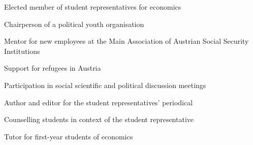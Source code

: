 

	{\begin{cvenumerate}
		\item Elected member of student representatives for economics
		\item Chairperson of a political youth organisation
	\end{cvenumerate}}

	{\begin{cvenumerate}
		\item Mentor for new employees at the Main Association of Austrian Social Security Institutions
		\item Support for refugees in Austria
		\item Participation in social scientific and political discussion meetings
	\end{cvenumerate}}

{\begin{cvenumerate}
		\item Author and editor for the student representatives' periodical
		\item Counselling students in context of the student representative
		\item Tutor for first-year students of economics
	\end{cvenumerate}}